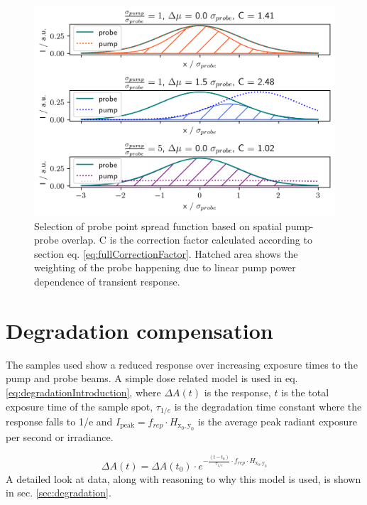 \documentclass[twoside,openright,listof=numbered]{scrreprt}
\def\radiantExp{\ensuremath{H_\mathrm{x_0,y_0}}}
\begin{document}
\begin{figure}[!hb]
\centering
\includegraphics[scale=1]{images/OverlapVisualisationProbeSelection.png}
\caption[Selection of probe point spread function based on spatial pump-probe overlap.]{Selection of probe point spread function based on spatial pump-probe overlap. C is the correction factor calculated according to section eq. \ref{eq:fullCorrectionFactor}. Hatched area shows the weighting of the probe happening due to linear pump power dependence of transient response.\label{fig:overlapVisualisation}}
\end{figure}

\section{Degradation compensation}
The samples used show a reduced response over increasing exposure times to the pump and probe beams. A simple dose related model is used in eq. \ref{eq:degradationIntroduction}, where $\Delta A(t)$ is the response, $t$ is the total exposure time of the sample spot, $\tau_{1/e}$ is the degradation time constant where the response falls to 1/e and $I_{\mathrm{peak}} = f_{rep}\cdot \radiantExp$ is the average peak radiant exposure per second or irradiance.

\begin{equation}\label{eq:degradationIntroduction}
\Delta A(t) = \Delta A(t_0)\cdot e^{-\frac{(t-t_0)}{\tau_{1/e}}\cdot f_{rep}\cdot \radiantExp}
\end{equation}
A detailed look at data, along with reasoning to why this model is used, is shown in sec. \ref{sec:degradation}.
\end{document}
